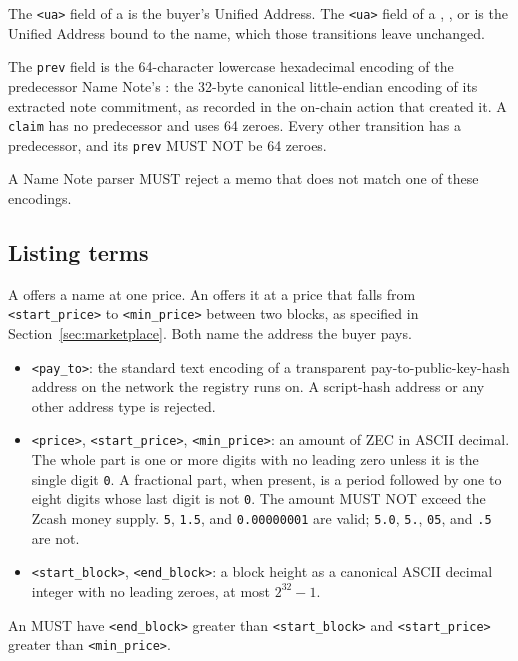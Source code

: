 The \texttt{<ua>} field of a  is the buyer's Unified Address. The \texttt{<ua>} field of a , , or  is the Unified Address bound to the name, which those transitions leave unchanged.

The \texttt{prev} field is the 64-character lowercase hexadecimal encoding of the predecessor Name Note's : the 32-byte canonical little-endian encoding of its extracted note commitment, as recorded in the on-chain action that created it. A \texttt{claim} has no predecessor and uses 64 zeroes. Every other transition has a predecessor, and its \texttt{prev} MUST NOT be 64 zeroes.

A Name Note parser MUST reject a memo that does not match one of these encodings.

\subsection{Listing terms}
\label{sec:listing-terms}

A  offers a name at one price. An  offers it at a price that falls from \texttt{<start\_price>} to \texttt{<min\_price>} between two blocks, as specified in Section~\ref{sec:marketplace}. Both name the address the buyer pays.

\begin{itemize}
  \item \texttt{<pay\_to>}: the standard text encoding of a transparent pay-to-public-key-hash address on the network the registry runs on. A script-hash address or any other address type is rejected.
  \item \texttt{<price>}, \texttt{<start\_price>}, \texttt{<min\_price>}: an amount of ZEC in ASCII decimal. The whole part is one or more digits with no leading zero unless it is the single digit \texttt{0}. A fractional part, when present, is a period followed by one to eight digits whose last digit is not \texttt{0}. The amount MUST NOT exceed the Zcash money supply. \texttt{5}, \texttt{1.5}, and \texttt{0.00000001} are valid; \texttt{5.0}, \texttt{5.}, \texttt{05}, and \texttt{.5} are not.
  \item \texttt{<start\_block>}, \texttt{<end\_block>}: a block height as a canonical ASCII decimal integer with no leading zeroes, at most $2^{32}-1$.
\end{itemize}

An  MUST have \texttt{<end\_block>} greater than \texttt{<start\_block>} and \texttt{<start\_price>} greater than \texttt{<min\_price>}.

